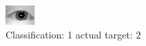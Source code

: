\begin{figure}[h!]
\begin{center}
\includegraphics[width=0.60\columnwidth]{figures/ID960_class_1_target_2.png}
\end{center}
\caption{ Classification: 1 actual target: 2}
\label{fig:ID960_class_1_target_2}
\end{figure}
